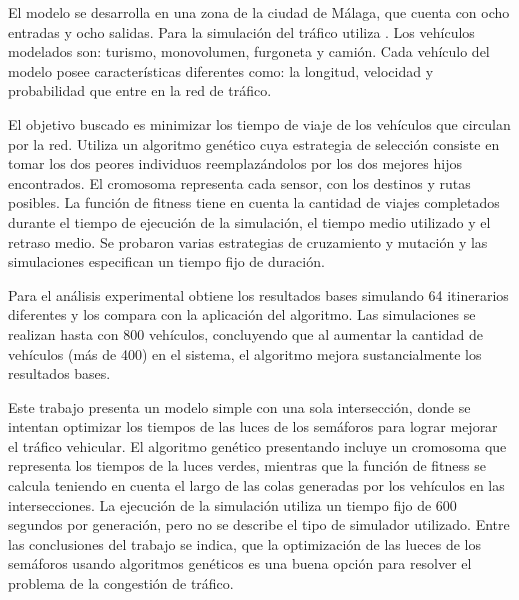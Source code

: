 \begin{itemize}
\begin{item}
El modelo se desarrolla en una zona  de la ciudad de Málaga, que cuenta con ocho entradas y ocho salidas. Para la simulación del tráfico utiliza \citet{SUMO}. Los vehículos modelados son: turismo, monovolumen, furgoneta y camión. Cada vehículo del modelo posee características diferentes como: la longitud, velocidad y probabilidad que entre en la red de tráfico.

El objetivo buscado es minimizar los tiempo de viaje de los vehículos que circulan por la red. Utiliza un algoritmo genético cuya estrategia de selección consiste en tomar los dos peores individuos reemplazándolos por los dos mejores hijos encontrados. El cromosoma representa cada sensor, con los destinos y rutas posibles. La función de fitness tiene en cuenta la cantidad de viajes completados durante el tiempo de ejecución de la simulación, el tiempo medio utilizado y el retraso medio. Se probaron varias estrategias de cruzamiento y mutación y las simulaciones especifican un tiempo fijo de duración.

Para el análisis experimental obtiene los resultados bases simulando 64 itinerarios diferentes y los compara con la aplicación del algoritmo. Las simulaciones se realizan hasta con 800 vehículos, concluyendo que al aumentar la cantidad de vehículos (más de 400) en el sistema, el algoritmo mejora sustancialmente los resultados bases.

\end{item}	


\begin{item}

Este trabajo presenta un modelo simple con una sola intersección, donde se intentan optimizar los tiempos de las luces de los semáforos para lograr mejorar el tráfico vehicular. El algoritmo genético presentando incluye un cromosoma que representa los tiempos de la luces verdes, mientras que la función de fitness se calcula teniendo en cuenta el largo de las colas generadas por los vehículos en las intersecciones. La ejecución de la simulación utiliza un tiempo fijo de 600 segundos por generación, pero no se describe el tipo de simulador utilizado. Entre las conclusiones del trabajo se indica, que la optimización de las lueces de los semáforos usando algoritmos genéticos es una buena opción para resolver el problema de la congestión de tráfico.	
\end{item}	


\begin{item}


\end{item}
\end{itemize}
